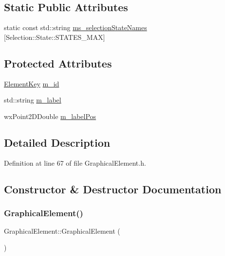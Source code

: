 \subsection*{Static Public Attributes}
\begin{DoxyCompactItemize}
\item 
static const std\+::string \hyperlink{class_graphical_element_afac661e0e1c8a699c8f8264dc99437cc}{ms\+\_\+selection\+State\+Names} \mbox{[}Selection\+::\+State\+::\+S\+T\+A\+T\+E\+S\+\_\+\+M\+AX\mbox{]}
\end{DoxyCompactItemize}
\subsection*{Protected Attributes}
\begin{DoxyCompactItemize}
\item 
\hyperlink{_graphical_element_8h_ade5fd6c85839a416577ff9de1605141e}{Element\+Key} \hyperlink{class_graphical_element_a03d7e29a10d456a4944ce06c6964d15a}{m\+\_\+id}
\item 
std\+::string \hyperlink{class_graphical_element_ae7f90a74fb05130a8bb97617b433c918}{m\+\_\+label}
\item 
wx\+Point2\+D\+Double \hyperlink{class_graphical_element_acc200c4f7baf224cc972021d0c66cf35}{m\+\_\+label\+Pos}
\end{DoxyCompactItemize}


\subsection{Detailed Description}


Definition at line 67 of file Graphical\+Element.\+h.



\subsection{Constructor \& Destructor Documentation}
\mbox{\label{class_graphical_element_a9f116ee2cd16dd099c2579864415d7b8}} 
\subsubsection{\texorpdfstring{Graphical\+Element()}{GraphicalElement()}\hspace{0.1cm}{\footnotesize\ttfamily [1/3]}}
{\footnotesize\ttfamily Graphical\+Element\+::\+Graphical\+Element (\begin{DoxyParamCaption}{ }\end{DoxyParamCaption})}



